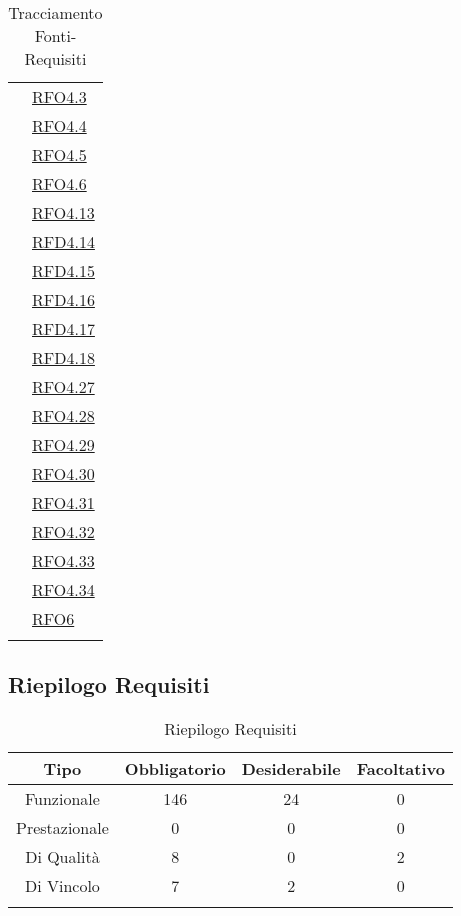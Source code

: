 \begin{longtable}{|>{\centering}m{5cm}|m{5cm}<{\centering}|}
& \hyperlink{RFO4.3}{RFO4.3}\\
& \hyperlink{RFO4.4}{RFO4.4}\\
& \hyperlink{RFO4.5}{RFO4.5}\\
& \hyperlink{RFO4.6}{RFO4.6}\\
& \hyperlink{RFO4.13}{RFO4.13}\\
& \hyperlink{RFD4.14}{RFD4.14}\\
& \hyperlink{RFD4.15}{RFD4.15}\\
& \hyperlink{RFD4.16}{RFD4.16}\\
& \hyperlink{RFD4.17}{RFD4.17}\\
& \hyperlink{RFD4.18}{RFD4.18}\\
& \hyperlink{RFO4.27}{RFO4.27}\\
& \hyperlink{RFO4.28}{RFO4.28}\\
& \hyperlink{RFO4.29}{RFO4.29}\\
& \hyperlink{RFO4.30}{RFO4.30}\\
& \hyperlink{RFO4.31}{RFO4.31}\\
& \hyperlink{RFO4.32}{RFO4.32}\\
& \hyperlink{RFO4.33}{RFO4.33}\\
& \hyperlink{RFO4.34}{RFO4.34}\\
& \hyperlink{RFO6}{RFO6}\\ \hline
\caption[Tracciamento Fonti-Requisiti]{Tracciamento Fonti-Requisiti}
\label{tabella:fonti-requi}
\end{longtable}
\clearpage

\subsection{Riepilogo Requisiti}
\normalsize
\begin{longtable}{|c|c|c|c|}
\hline
\textbf{Tipo} & \textbf{Obbligatorio} & \textbf{Desiderabile} & \textbf{Facoltativo}\\
\hline
Funzionale & 146 & 24 & 0\\ \hline
Prestazionale & 0 & 0 & 0\\ \hline
Di Qualità & 8 & 0 & 2\\ \hline
Di Vincolo & 7 & 2 & 0\\ \hline
\caption[Riepilogo Requisiti]{Riepilogo Requisiti}
\label{tabella:riepilogorequi}
\end{longtable}
\clearpage






